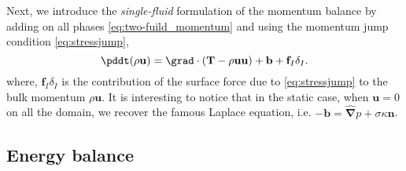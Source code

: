 Next, we introduce the \textit{single-fluid} formulation of the momentum balance by adding on all phases \ref{eq:two-fuild_momentum} and using the momentum jump condition \ref{eq:stressjump}, 
\begin{equation}
   \pddt (\rho \textbf{u})
    = \grad \cdot (\textbf{T} -\rho  \textbf{u} \textbf{u})
    + \textbf{b}
    + \textbf{f}_I\delta_I.
    \label{eq:one-fuild_momentum}
\end{equation}
where, $\textbf{f}_I\delta_I$ is the contribution of the surface force due to \ref{eq:stressjump} to the bulk momentum $\rho \textbf{u}$. 
It is interesting to notice that in the static case, when $\textbf{u}=0$ on all the domain, we recover the famous Laplace equation, i.e. $ -\bm{b} = \hat{\bm{\nabla}}p +\sigma \kappa \textbf{n} $.

\subsection{Energy balance}

